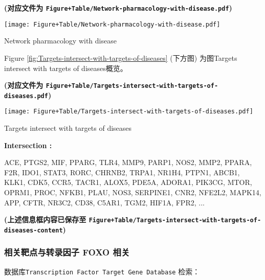 \documentclass[
]{article}
\begin{document}
\textbf{(对应文件为 \texttt{Figure+Table/Network-pharmacology-with-disease.pdf})}

\def\@captype{figure}
\begin{center}
\texttt{[image: Figure+Table/Network-pharmacology-with-disease.pdf]}
\caption{Network pharmacology with disease}\label{fig:Network-pharmacology-with-disease}
\end{center}

Figure \ref{fig:Targets-intersect-with-targets-of-diseases} (下方图) 为图Targets intersect with targets of diseases概览。

\textbf{(对应文件为 \texttt{Figure+Table/Targets-intersect-with-targets-of-diseases.pdf})}

\def\@captype{figure}
\begin{center}
\texttt{[image: Figure+Table/Targets-intersect-with-targets-of-diseases.pdf]}
\caption{Targets intersect with targets of diseases}\label{fig:Targets-intersect-with-targets-of-diseases}
\end{center}
\begin{center}\begin{tcolorbox}[colback=gray!10, colframe=gray!50, width=0.9\linewidth, arc=1mm, boxrule=0.5pt]
\textbf{
Intersection
:}

\vspace{0.5em}

    ACE, PTGS2, MIF, PPARG, TLR4, MMP9, PARP1, NOS2, MMP2,
PPARA, F2R, IDO1, STAT3, RORC, CHRNB2, TRPA1, NR1H4, PTPN1,
ABCB1, KLK1, CDK5, CCR5, TACR1, ALOX5, PDE5A, ADORA1,
PIK3CG, MTOR, OPRM1, PROC, NFKB1, PLAU, NOS3, SERPINE1,
CNR2, NFE2L2, MAPK14, APP, CFTR, NR3C2, CD38, C5AR1, TGM2,
HIF1A, FPR2, ...

\vspace{2em}
\end{tcolorbox}
\end{center}

\textbf{(上述信息框内容已保存至 \texttt{Figure+Table/Targets-intersect-with-targets-of-diseases-content})}

\hypertarget{ux76f8ux5173ux9776ux70b9ux4e0eux8f6cux5f55ux56e0ux5b50-foxo-ux76f8ux5173}{%
\subsubsection{相关靶点与转录因子 FOXO 相关}\label{ux76f8ux5173ux9776ux70b9ux4e0eux8f6cux5f55ux56e0ux5b50-foxo-ux76f8ux5173}}

数据库\texttt{Transcription\ Factor\ Target\ Gene\ Database} 检索：
\end{document}
